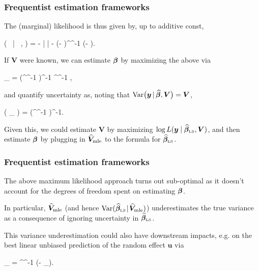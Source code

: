 \documentclass[18pt]{beamer}
\newcommand{\randEff}{u}
\newcommand{\bZ}{\bm{Z}}
\newcommand{\lse}[1]{\widehat{#1}_{\scriptsize \text{\tiny \rmfamily LS}}} %
\newcommand{\blup}[1]{\widehat{#1}_{\scriptsize \text{\tiny \rmfamily BLUP}}}
\newcommand{\frametitleText}{This is a frame title}
\begin{document}
\renewcommand{\frametitleText}{Frequentist estimation frameworks}
\begin{frame}
\frametitle{\frametitleText}
The (marginal)  likelihood is thus given by, up to additive const, 
\begin{tightEquation*}
\log \likelihood (
	\by 
	\, \thinnerspace | \,  \thinnerspace 
	\bbeta, 
) 
	= -   \log |  |
	-  (\by - \bX \bbeta)^\transpose {}^{-1} (\by - \bX \bbeta).
\end{tightEquation*}

\pause
\smallskip
If $\bm{V}$ were known, 
we can estimate $\bm{\beta}$ by maximizing the above via
\begin{tightEquation*}
\lse{\bbeta}
	= (\bX^\transpose {}^{-1} \bX)^{-1} \bX^\transpose {}^{-1} \by,
\end{tightEquation*}
and quantify uncertainty as, noting that $\mathrm{Var}\bigl( \bm{y} \, | \, \widehat{\bm{\beta}}, \bm{V} \bigr) = \bm{V}$,
\begin{tightEquation*}
\variance( \lse{\bbeta} \given {} )
	= (\bX^\transpose {}^{-1} \bX)^{-1}.	
\end{tightEquation*}

\pause
Given this, we could estimate $\bm{V}$ by maximizing 
$\thinnerspace \log \likelihood (
	\by 
	\, \thinnerspace | \,  \thinnerspace 
	\lse{\bbeta}, \bm{V}
)$,
and then estimate $\bm{\beta}$ by plugging in $\widehat{\bm{V}}_{\textrm{mle}}$ to the formula for $\lse{\bbeta}$.
\end{frame}


\begin{frame}
\frametitle{\frametitleText}
The above maximum likelihood approach turns out sub-optimal as it doesn't account for the degrees of freedom spent on estimating $\bm{\beta}$. 

\pause
\smallskip
In particular, $\widehat{\bm{V}}_{\textrm{mle}}$ (and hence $\variance( \lse{\bbeta} \given \mle{\bm{V}} )$) underestimates the true variance as a consequence of ignoring uncertainty in $\lse{\bbeta}$.

\pause
\smallskip
This variance underestimation could also have downstream impacts, e.g. on the best linear unbiased prediction of the random effect $\bm{\randEff}$ via%
\begin{tightEquation*}
\blup{\bm{\randEff}}
	=  \bZ^\transpose {}^{-1} (\by - \bX \lse{\bbeta}).
\end{tightEquation*}
\end{frame}
\end{document}
